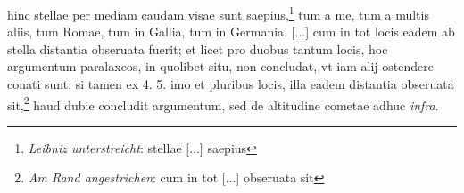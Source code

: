 \pend \pstart [p.~182] [...] hinc stellae\protect{} per mediam caudam\protect{} visae sunt saepius,\footnote{\textit{Leibniz unterstreicht}: stellae [...] saepius} tum a me, tum a multis aliis, tum Romae\protect{}, tum in Gallia\protect{}, tum in Germania\protect{}. [...] cum in tot locis eadem ab  stella\protect{} distantia obseruata fuerit; et licet pro duobus tantum locis, hoc argumentum paralaxeos, in quolibet situ, non concludat, vt iam alij ostendere conati\protect{} sunt; si tamen ex 4. 5. imo et pluribus locis, illa eadem distantia obseruata sit,\footnote{\textit{Am Rand angestrichen}: cum in tot [...] obseruata sit} haud dubie concludit argumentum, sed de altitudine cometae\protect{} adhuc \textit{infra}. 